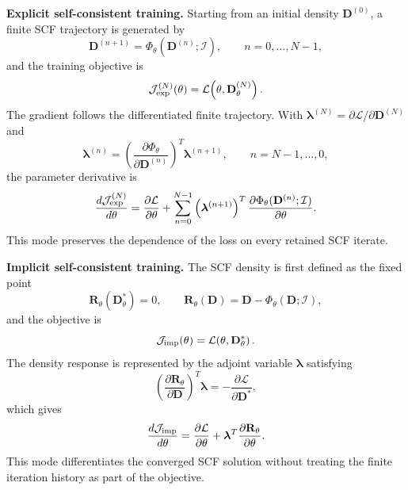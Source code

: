 \textbf{Explicit self-consistent training.} Starting from an initial
density $\mathbf{D}^{(0)}$, a finite SCF trajectory is generated by
\begin{equation}
  \mathbf{D}^{(n+1)}
  =
  \Phi_{\theta}(\mathbf{D}^{(n)};\mathcal{I}),
  \qquad n=0,\ldots,N-1,
  \label{eq:unrolled-scf}
\end{equation}
and the training objective is
\begin{equation}
  \mathcal{J}_{\rm exp}^{(N)}(\theta)
  =
  \mathcal{L}\!\left(\theta,\mathbf{D}^{(N)}_{\theta}\right).
  \label{eq:explicit-objective}
\end{equation}
The gradient follows the differentiated finite trajectory. With
$\boldsymbol{\lambda}^{(N)}
=\partial\mathcal{L}/\partial\mathbf{D}^{(N)}$ and
\begin{equation}
  \boldsymbol{\lambda}^{(n)}
  =
  \left(
    \frac{\partial\Phi_{\theta}}
         {\partial\mathbf{D}^{(n)}}
  \right)^{T}
  \boldsymbol{\lambda}^{(n+1)},
  \qquad n=N-1,\ldots,0,
  \label{eq:explicit-adjoint}
\end{equation}
the parameter derivative is
\begin{equation}
  \frac{d\mathcal{J}_{\rm exp}^{(N)}}{d\theta}
  =
  \frac{\partial\mathcal{L}}{\partial\theta}
  +
  \sum_{n=0}^{N-1}
  \left(\boldsymbol{\lambda}^{(n+1)}\right)^{T}
  \frac{\partial\Phi_{\theta}(\mathbf{D}^{(n)};\mathcal{I})}
       {\partial\theta}.
  \label{eq:explicit-gradient}
\end{equation}
This mode preserves the dependence of the loss on every retained SCF
iterate.

\textbf{Implicit self-consistent training.} The SCF density is first
defined as the fixed point
\begin{equation}
  \mathbf{R}_{\theta}(\mathbf{D}^{*}_{\theta})=0,
  \qquad
  \mathbf{R}_{\theta}(\mathbf{D})
  =
  \mathbf{D}-\Phi_{\theta}(\mathbf{D};\mathcal{I}),
  \label{eq:implicit-fixed-point}
\end{equation}
and the objective is
\begin{equation}
  \mathcal{J}_{\rm imp}(\theta)
  =
  \mathcal{L}\!\left(\theta,\mathbf{D}^{*}_{\theta}\right).
  \label{eq:implicit-objective}
\end{equation}
The density response is represented by the adjoint variable
$\boldsymbol{\lambda}$ satisfying
\begin{equation}
  \left(
    \frac{\partial \mathbf{R}_{\theta}}
         {\partial \mathbf{D}}
  \right)^{T}
  \boldsymbol{\lambda}
  =
  -
  \frac{\partial\mathcal{L}}
       {\partial\mathbf{D}^{*}},
  \label{eq:implicit-adjoint}
\end{equation}
which gives
\begin{equation}
  \frac{d\mathcal{J}_{\rm imp}}{d\theta}
  =
  \frac{\partial\mathcal{L}}{\partial\theta}
  +
  \boldsymbol{\lambda}^{T}
  \frac{\partial\mathbf{R}_{\theta}}
       {\partial\theta}.
  \label{eq:implicit-scf-gradient}
\end{equation}
This mode differentiates the converged SCF solution without treating
the finite iteration history as part of the objective.

